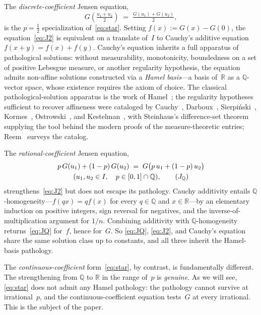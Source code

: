 \documentclass{article}
\theoremstyle{plain}
\theoremstyle{definition}
\newcommand{\R}{\mathbb{R}}
\newcommand{\Q}{\mathbb{Q}}
\begin{document}
The \emph{discrete-coefficient} Jensen equation,
\begin{equation}
G\!\left(\tfrac{u_1+u_2}{2}\right) \;=\; \tfrac{G(u_1)+G(u_2)}{2},
\tag{$J_2$}\label{eq:J2}
\end{equation}
is the $p=\tfrac{1}{2}$ specialization of~\eqref{eq:star}. Setting
$f(x):=G(x)-G(0)$, the equation~\eqref{eq:J2} is equivalent on a
translate of~$I$ to Cauchy's additive equation $f(x+y)=f(x)+f(y)$.
Cauchy's equation inherits a full apparatus of pathological solutions:
without measurability, monotonicity, boundedness on a set of positive
Lebesgue measure, or another regularity hypothesis, the equation admits
non-affine solutions constructed via a \emph{Hamel basis}---a basis
of~$\R$ as a $\Q$-vector space, whose existence requires the axiom of
choice. The classical pathological-solution apparatus is the work of
Hamel~\cite{Hamel1905}; the regularity hypotheses sufficient to recover
affineness were cataloged by Cauchy~\cite{Cauchy1821},
Darboux~\cite{Darboux1875,Darboux1880}, Sierpi\'nski~\cite{Sierpinski1920},
Kormes~\cite{Kormes1926}, Ostrowski~\cite{Ostrowski1929}, and
Kestelman~\cite{Kestelman1947}, with Steinhaus's difference-set
theorem~\cite{Steinhaus1920} supplying the tool behind the modern
proofs of the measure-theoretic entries; Reem~\cite{Reem2017} surveys
the catalog.

The \emph{rational-coefficient} Jensen equation,
\begin{multline}
p\,G(u_1)+(1-p)\,G(u_2)
  \;=\; G\bigl(p\,u_1+(1-p)\,u_2\bigr) \\
  (u_1,u_2\in I,\quad p\in[0,1]\cap\Q),
\tag{$J_\Q$}\label{eq:JQ}
\end{multline}
strengthens~\eqref{eq:J2} but does not escape its pathology. Cauchy
additivity entails $\Q$-homogeneity---$f(qx)=qf(x)$ for every $q\in\Q$
and $x\in\R$---by an elementary induction on positive integers, sign
reversal for negatives, and the inverse-of-multiplication argument for
$1/n$. Combining additivity with $\Q$-homogeneity
returns~\eqref{eq:JQ} for~$f$, hence for~$G$. So \eqref{eq:JQ},
\eqref{eq:J2}, and Cauchy's equation share the same solution class up to
constants, and all three inherit the Hamel-basis pathology.

The \emph{continuous-coefficient} form~\eqref{eq:star}, by contrast, is
fundamentally different. The strengthening from $\Q$ to $\R$ in the
range of~$p$ is \emph{genuine}. As we will see, \eqref{eq:star} does not
admit any Hamel pathology: the pathology cannot survive at irrational~$p$,
and the continuous-coefficient equation tests~$G$ at every irrational.
This is the subject of the paper.
\end{document}
